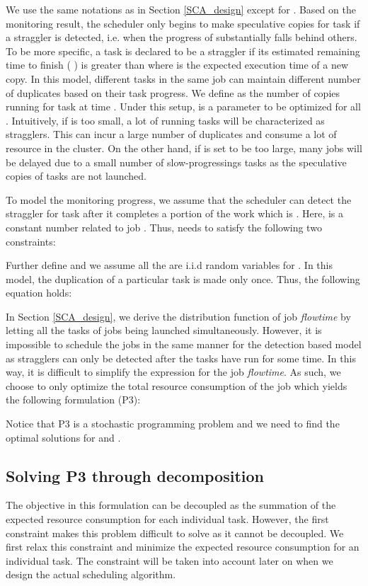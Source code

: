 \documentclass[10pt,conference]{IEEEtran}
\begin{document}
We use the same notations as in Section \ref{SCA_design} except for .  Based on the monitoring result, the scheduler only begins to make speculative copies for task  if a straggler is detected, i.e.  when the progress of  substantially falls behind others. To be more specific,
a task is declared to be a straggler if its estimated remaining time to finish (  ) is
greater than  where  is the expected execution time of a new copy. In this model, different tasks in the same job can maintain different number of duplicates based on their task progress. We define  as the number of copies running for task  at time .
Under this setup,   is a parameter to be optimized for all . Intuitively, if  is too small, a lot of running tasks will be characterized as stragglers. This can incur a large number of duplicates and consume a lot of resource in the cluster. On the other hand, if  is set to be too large, many jobs will be delayed due to a small number of  slow-progressings tasks  as the speculative copies of tasks are not launched.


To model the monitoring progress, we assume that the scheduler can detect the straggler for task  after it completes a portion of the work which is . Here,  is a constant number related to job . Thus,  needs to satisfy the following two constraints:
 


 Further define  and we assume all the  are i.i.d random variables for . In this model, the duplication of a particular task is made only once. Thus, the following equation holds:

In Section \ref{SCA_design}, we derive the distribution function of job \textit{flowtime} by letting all the tasks of jobs being launched simultaneously. However, it is impossible to schedule the jobs in the same manner for the detection based model as stragglers can only be detected after the tasks have run for some time. In this way, it is difficult to simplify the expression for the job \textit{flowtime}. As such,  we choose to only optimize the total resource consumption of the job which yields the following formulation (P3):

Notice that P3 is a stochastic programming problem and we need to find the optimal solutions for  and .

\subsection{Solving P3 through decomposition}
The objective in this formulation can be decoupled as the summation of the expected resource consumption for each individual task. However, the first constraint makes this problem difficult to solve as it cannot be decoupled. We first relax this constraint and minimize the expected resource consumption for an individual task. The constraint will be taken into account later on when we design the actual scheduling algorithm.
\end{document}
